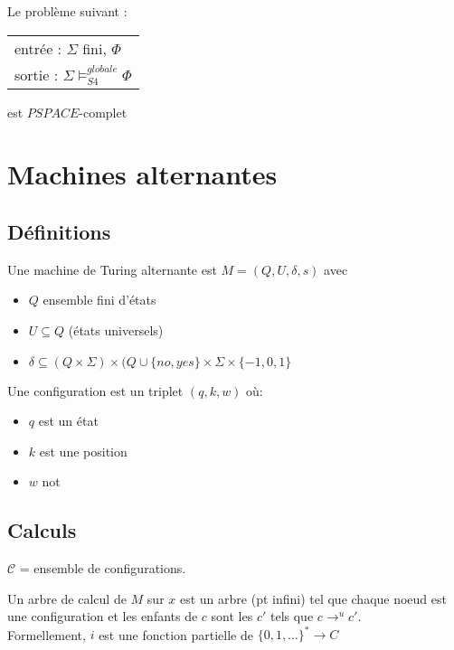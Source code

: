 \documentclass[10pt,a4paper]{article}
\begin{document}
\begin{prop}
 Le problème suivant :
\begin{tabular}{l}
entrée : $\Sigma$ fini, $\Phi$\\
sortie : $\Sigma \models_{S4}^{globale} \Phi$
\end{tabular}
est $PSPACE$-complet
\end{prop}


\section{Machines alternantes}

\subsection{Définitions}

\begin{definition}
 Une machine de Turing alternante est $M = (Q, U, \delta, s)$ avec
\begin{itemize}
 \item $Q$ ensemble fini d'états
 \item $U \subseteq Q$ (états universels)
 \item $\delta \subseteq (Q \times \Sigma) \times (Q \cup \{no, yes \} \times \Sigma \times \{-1,0,1\}$
\end{itemize}
\end{definition}

\begin{definition}
Une configuration est un triplet $(q,k,w)$ où: 
\begin{itemize}
 \item $q$ est un état
 \item $k$ est une position
 \item $w$ not
\end{itemize}

\end{definition}

\subsection{Calculs}

$\mathcal{C}$ = ensemble de configurations.

\begin{definition}
 Un arbre de calcul de $M$ sur $x$ est un arbre (pt infini) tel que chaque noeud est une configuration et les enfants de $c$ sont les $c'$ tels que $c →^u c'$.\\
Formellement, $i$ est une fonction partielle de $\{0,1,\dots \} ^* → C$
\end{definition}
\end{document}
